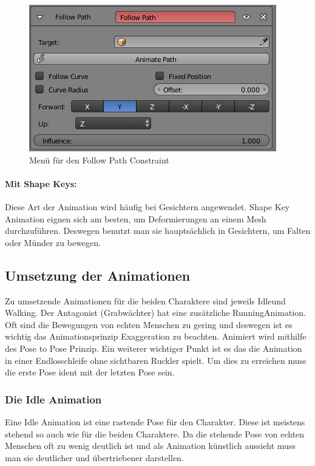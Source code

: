 \begin{figure}[H]
    \centering

    \includegraphics[width=.8\textwidth]{images/animation_path_constraint.png}
    \caption{Menü für den Follow Path Constraint}
\end{figure}

\paragraph{Mit Shape Keys:}
Diese Art der Animation wird häufig bei Gesichtern angewendet. Shape Key Animation eignen sich am besten, um Deformierungen an einem Mesh durchzuführen.
Deswegen benutzt man sie hauptsächlich in Gesichtern, um Falten oder Münder zu bewegen.

\subsection{Umsetzung der Animationen}
Zu umsetzende Animationen für die beiden Charaktere sind jeweils \dq Idle\dq und \dq Walking\dq. Der Antagonist (Grabwächter)
hat eine zusätzliche \dq Running\dq Animation. Oft sind die Bewegungen von echten Menschen zu gering und deswegen ist es wichtig das Animationsprinzip \dq Exaggeration\dq
zu beachten. Animiert wird mithilfe des Pose to Pose Prinzip. Ein weiterer wichtiger Punkt ist es das die Animation in einer Endlosschleife
ohne sichtbaren Ruckler spielt. Um dies zu erreichen muss die erste Pose ident mit der letzten Pose sein.

\subsubsection{Die Idle Animation}
Eine Idle Animation ist eine rastende Pose für den Charakter. Diese ist meistens stehend so auch wie für die beiden Charaktere.
Da die stehende Pose von echten Menschen oft zu wenig deutlich ist und als Animation künstlich aussieht muss man sie deutlicher und übertriebener darstellen.

